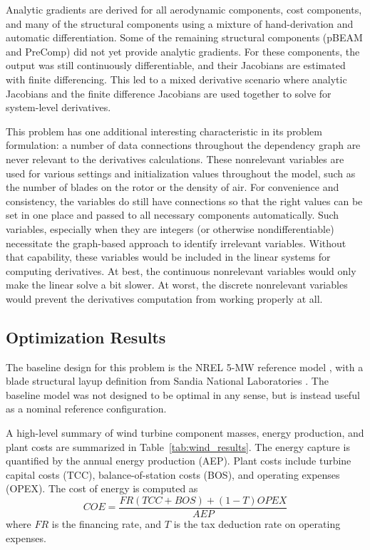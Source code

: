 \documentclass[]{aiaa-tc} %
\begin{document}
    Analytic gradients are derived for all aerodynamic components, cost components, and many of the
    structural components using a mixture of hand-derivation and automatic differentiation.  Some of
    the remaining structural components (pBEAM and PreComp) did not yet provide analytic gradients.
    For these components, the output was still continuously differentiable, and their Jacobians are
    estimated with finite differencing.  This led to a mixed derivative scenario where analytic
    Jacobians and the finite difference Jacobians are used together to solve for system-level
    derivatives.

    This problem has one additional interesting characteristic in its
    problem formulation: a number of data connections throughout the dependency
    graph are never relevant to the derivatives calculations. These nonrelevant
    variables are used for various settings and initialization values throughout the
    model, such as the number of blades on the rotor or the density of air. For convenience
    and consistency, the variables do still have connections so that the right values can
    be set in one place and passed to all necessary components automatically.
    Such variables, especially when they are integers (or otherwise nondifferentiable)
    necessitate the graph-based approach to identify irrelevant variables. Without that capability, these
    variables would be included in the linear systems for computing derivatives. At best,
    the continuous nonrelevant variables would only make the linear solve a bit slower.
    At worst, the discrete nonrelevant variables would prevent the derivatives computation from working properly at all.


    \subsection{Optimization Results}

    The baseline design for this problem is the NREL 5-MW reference model \cite{Jonkman2009}, with a blade structural layup definition from Sandia National Laboratories \cite{Resor2013}.  The baseline model was not designed to be optimal in any sense, but is instead useful as a nominal reference configuration.

    A high-level summary of wind turbine component masses, energy production, and plant costs are summarized in Table~\ref{tab:wind_results}.  The energy capture is quantified by the annual energy production (AEP).  Plant costs include turbine capital costs (TCC), balance-of-station costs (BOS), and operating expenses (OPEX).  The cost of energy is computed as
    \begin{equation}
    COE = \frac {FR (TCC + BOS) + (1-T) OPEX} {AEP}
    \end{equation}
    where $FR$ is the financing rate, and $T$ is the tax deduction rate on operating expenses.
\end{document}
